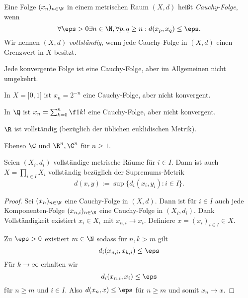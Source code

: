 \begin{df}
	Eine Folge $(x_n)_{n\in \N}$ in einem metrischen Raum $(X,d)$ heißt \emph{Cauchy-Folge}, wenn
	\[
		\forall \eps > 0 \exists n \in \N, \forall p,q \ge n : d(x_p,x_q) \le \eps.
	\]
	Wir nennen $(X,d)$ \emph{vollständig}, wenn jede Cauchy-Folge in $(X,d)$ einen Grenzwert in $X$ besitzt.
\end{df}

\begin{nt}
	Jede konvergente Folge ist eine Cauchy-Folge, aber im Allgemeinen nicht umgekehrt.
\end{nt}

\begin{ex}
	In $X = ]0,1]$ ist $x_n = 2^{-n}$ eine Cauchy-Folge, aber nicht konvergent.

	In $\Q$ ist $x_n = \sum_{k=0}^n \f 1{k!}$ eine Cauchy-Folge, aber nicht konvergent.
\end{ex}

\begin{st}
	$\R$ ist vollständig (bezüglich der üblichen euklidischen Metrik).

	Ebenso $\C$ und $\R^n, \C^n$ für $n \ge 1$.
\end{st}

\begin{st} \label{thm:metric_space_product_complete_supremum_metric}
	Seien $(X_i,d_i)$ vollständige metrische Räume für $i \in I$.
	Dann ist auch $X = \prod_{i\in I} X_i$ vollständig bezüglich der Supremums-Metrik
	\[
		d(x,y) := \sup \{ d_i(x_i, y_i) : i \in I \}.
	\]
	\begin{proof}
		Sei $(x_n)_{n\in \N}$ eine Cauchy-Folge in $(X,d)$.
		Dann ist für $i \in I$ auch jede Komponenten-Folge $(x_{n,i})_{n\in \N}$ eine Cauchy-Folge in $(X_i,d_i)$.
		Dank Vollständigkeit existiert $x_i \in X_i$ mit $x_{n,i} \to x_i$.
		Definiere $ x= (x_i)_{i\in I} \in X$.

		Zu  $\eps > 0$ existiert $m \in \N$ sodass für $n,k > m$ gilt
		\[
			d_i(x_{n,i}, x_{k,i}) \le \eps
		\]
		Für $k \to \infty$ erhalten wir
		\[
			d_i(x_{n,i},x_i) \le \eps
		\]
		für $n \ge m$ und $i \in I$.
		Also $d(x_n, x) \le \eps$ für $n \ge m$ und somit $x_n \to x$.
	\end{proof}
\end{st}

